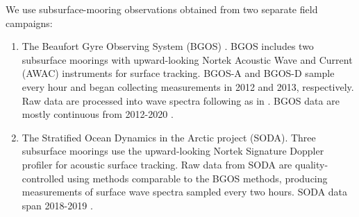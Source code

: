 \documentclass [11pt, proquest] {uwthesis}[2020/02/24]
\begin{document}
We use subsurface-mooring observations obtained from two separate field campaigns:
\begin{enumerate}
    \item The Beaufort Gyre Observing System (BGOS) \cite{Krishfield2014DeteriorationCycle}. BGOS includes two subsurface moorings with upward-looking Nortek Acoustic Wave and Current (AWAC) instruments for surface tracking. BGOS-A and BGOS-D sample every hour and began collecting measurements in 2012 and 2013, respectively. Raw data are processed into wave spectra following \cite{Herbers2012ObservingBuoys, Kuik1988AData, Thomson2018MeasurementsVehicle} as in \cite{Thomson2014SwellOcean, Smith2016}. BGOS data are mostly continuous from 2012-2020 \cite{Thomson2020Long-termSea}.  
    \item The Stratified Ocean Dynamics in the Arctic project (SODA). Three subsurface moorings use the upward-looking Nortek Signature Doppler profiler for acoustic surface tracking. Raw data from SODA are quality-controlled using methods comparable to the BGOS methods, producing measurements of surface wave spectra sampled every two hours. SODA data span 2018-2019 \cite{Brenner2021ComparingSea}.
\end{enumerate}
\end{document}
